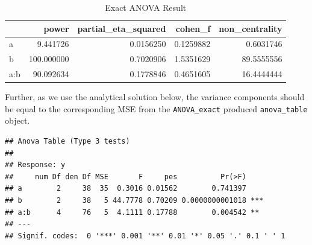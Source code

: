 \documentclass[
]{book}
\newenvironment{Shaded}{\begin{snugshade}}{\end{snugshade}}
\newcommand{\NormalTok}[1]{#1}
\newcommand{\SpecialCharTok}[1]{\textcolor[rgb]{0.00,0.00,0.00}{#1}}
\begin{document}
\begin{table}[!h]

\caption{\label{tab:unnamed-chunk-142}Exact ANOVA Result}
\centering
\begin{tabular}[t]{l|r|r|r|r}
\hline
  & power & partial\_eta\_squared & cohen\_f & non\_centrality\\
\hline
a & 9.441726 & 0.0156250 & 0.1259882 & 0.6031746\\
\hline
b & 100.000000 & 0.7020906 & 1.5351629 & 89.5555556\\
\hline
a:b & 90.092634 & 0.1778846 & 0.4651605 & 16.4444444\\
\hline
\end{tabular}
\end{table}

Further, as we use the analytical solution below, the variance components should be equal to the corresponding MSE from the \texttt{ANOVA\_exact} produced \texttt{anova\_table} object.

\begin{Shaded}
\end{Shaded}

\begin{verbatim}
## Anova Table (Type 3 tests)
## 
## Response: y
##     num Df den Df MSE       F     pes          Pr(>F)    
## a        2     38  35  0.3016 0.01562        0.741397    
## b        2     38   5 44.7778 0.70209 0.0000000001018 ***
## a:b      4     76   5  4.1111 0.17788        0.004542 ** 
## ---
## Signif. codes:  0 '***' 0.001 '**' 0.01 '*' 0.05 '.' 0.1 ' ' 1
\end{verbatim}
\end{document}
